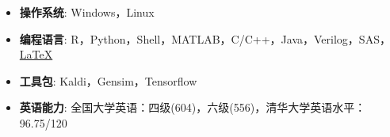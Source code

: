   \begin{itemize}[leftmargin=*]
    \item \textbf{操作系统}: Windows，Linux

    \item \textbf{编程语言}: R，Python，Shell，MATLAB，C/C++，Java，Verilog，SAS，
    \href{http://www.latex-project.org/}{\LaTeX}
    
    \item \textbf{工具包}: Kaldi，Gensim，Tensorflow

    \item \textbf{英语能力}: 全国大学英语：四级(604)，六级(556)，清华大学英语水平：96.75/120
  \end{itemize}
